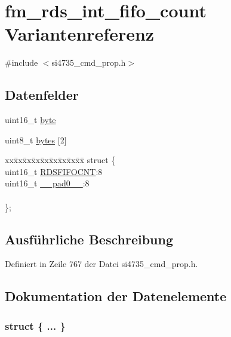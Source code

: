 \hypertarget{unionfm__rds__int__fifo__count}{}\section{fm\+\_\+rds\+\_\+int\+\_\+fifo\+\_\+count Variantenreferenz}
\label{unionfm__rds__int__fifo__count}


{\ttfamily \#include $<$si4735\+\_\+cmd\+\_\+prop.\+h$>$}

\subsection*{Datenfelder}
\begin{DoxyCompactItemize}
\item 
uint16\+\_\+t \hyperlink{unionfm__rds__int__fifo__count_ab0549c1b5ea980a02e7eab77e21fea49}{byte}
\item 
uint8\+\_\+t \hyperlink{unionfm__rds__int__fifo__count_a46e4c05d20a047ec169f60d3167e912e}{bytes} \mbox{[}2\mbox{]}
\item 
\begin{tabbing}
xx\=xx\=xx\=xx\=xx\=xx\=xx\=xx\=xx\=\kill
struct \{\\
\>uint16\_t \hyperlink{unionfm__rds__int__fifo__count_a6273d3e5b093640f3492cb7eaad78cdc}{RDSFIFOCNT}:8\\
\>uint16\_t \hyperlink{unionfm__rds__int__fifo__count_a77132c2c26a75f5b8751b235cda23828}{\_\_pad0\_\_}:8\\
\>\\
\}; \\

\end{tabbing}\end{DoxyCompactItemize}


\subsection{Ausführliche Beschreibung}


Definiert in Zeile 767 der Datei si4735\+\_\+cmd\+\_\+prop.\+h.



\subsection{Dokumentation der Datenelemente}
\hypertarget{unionfm__rds__int__fifo__count_a94208b7a3f9a6cb9c7361677e87a8f34}{}\subsubsection[{"@93}]{\setlength{\rightskip}{0pt plus 5cm}struct \{ ... \} }\label{unionfm__rds__int__fifo__count_a94208b7a3f9a6cb9c7361677e87a8f34}
\hypertarget{unionfm__rds__int__fifo__count_a77132c2c26a75f5b8751b235cda23828}{}
